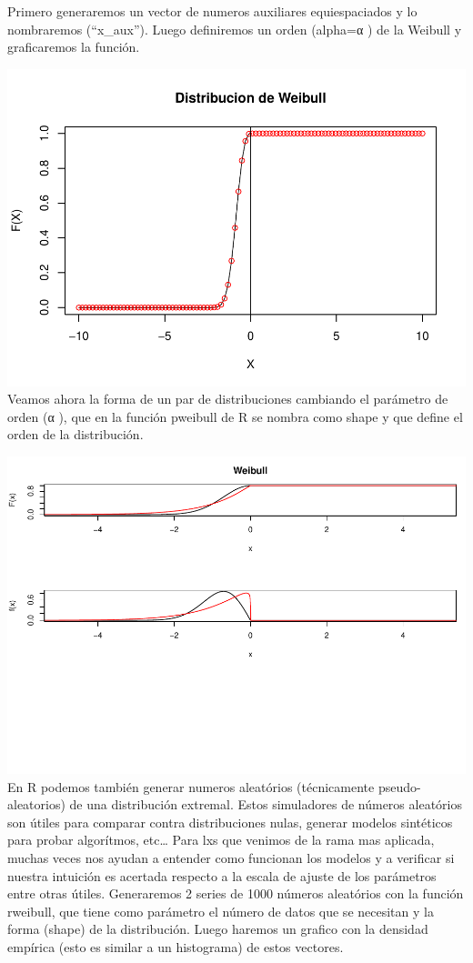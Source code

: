\documentclass[
  oneside]{book}
\begin{document}
Primero generaremos un vector de numeros auxiliares equiespaciados y lo
nombraremos (``x\_aux''). Luego definiremos un orden (alpha=α ) de la
Weibull y graficaremos la función.

\includegraphics{extremales_files/figure-latex/unnamed-chunk-8-1.pdf}
Veamos ahora la forma de un par de distribuciones cambiando el parámetro
de orden (α ), que en la función pweibull de R se nombra como shape y
que define el orden de la distribución.

\includegraphics{extremales_files/figure-latex/unnamed-chunk-9-1.pdf} En
R podemos también generar numeros aleatórios (técnicamente
pseudo-aleatorios) de una distribución extremal. Estos simuladores de
números aleatórios son útiles para comparar contra distribuciones nulas,
generar modelos sintéticos para probar algorítmos, etc\ldots{} Para lxs
que venimos de la rama mas aplicada, muchas veces nos ayudan a entender
como funcionan los modelos y a verificar si nuestra intuición es
acertada respecto a la escala de ajuste de los parámetros entre otras
útiles. Generaremos 2 series de 1000 números aleatórios con la función
rweibull, que tiene como parámetro el número de datos que se necesitan y
la forma (shape) de la distribución. Luego haremos un grafico con la
densidad empírica (esto es similar a un histograma) de estos vectores.
\end{document}
